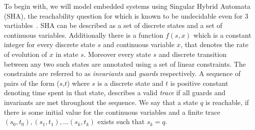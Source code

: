 To begin with, we will model embedded systems using Singular Hybrid Automata (SHA), the reachability question for which is known to be undecidable even for 3 vartiables~\cite{HKPV98}. SHA can be described as a set of discrete states and a set of continuous variables. Additionally there is a function $f(s,x)$ which is a constant integer for every discrete state $s$ and continuous variable $x$, that denotes the rate of evolution of $x$ in state $s$. Moreover every state $s$ and discrete transition between any two such states are annotated using a set of linear constraints. The constraints are referred to as \emph{invariants} and \emph{guards} respectively. A sequence of pairs of the form ($s$,$t$) where $s$ is a discrete state and $t$ is positive constant denoting time spent in that state, describes a valid \emph{trace} if all guards and invariants are met throughout the sequence. We say that a state $q$ is reachable, if there is some initial value for the continuous variables and a finite trace $(s_0, t_0), (s_1, t_1),\ldots (s_k,t_k)$ exists such that $s_k = q$. 

